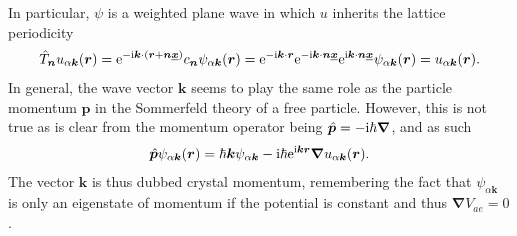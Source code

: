 In particular, $\psi$ is a weighted plane wave in which $u$ inherits the lattice periodicity
\begin{align}
    \hat T_{\bm n} u_{\alpha{\bm k}}({\bm r})
    =
    \mathrm e^{-\mathrm i{\bm k}\cdot \left( {\bm r}+{\bm n}\underline{\bm x} \right)}c_{\bm n}\psi_{\alpha{\bm k}}({\bm r})
    =
    \mathrm e^{-\mathrm i{\bm k}\cdot {\bm r}}\mathrm e^{-\mathrm i{\bm k}\cdot {\bm n}\underline{\bm x}}\mathrm e^{\mathrm i{\bm k}\cdot {\bm n}\underline{\bm x}}\psi_{\alpha{\bm k}}({\bm r})
    =
    u_{\alpha{\bm k}}({\bm r}).
\end{align}
In general, the wave vector $\bm k$ seems to play the same role as the particle momentum $\bm p$ in the Sommerfeld theory of a free particle.
However, this is not true as is clear from the momentum operator being $\hat{\bm p}=-\mathrm i\hbar\bm \nabla$, and as such
\begin{align}
  \hat{\bm p}\psi_{\alpha{\bm k}}({\bm r}) = \hbar{\bm k}\psi_{\alpha{\bm k}} - \mathrm i\hbar\mathrm e^{\mathrm i{\bm k}{\bm r}}\bm\nabla u_{\alpha \bm k}(\bm r).
\end{align}
The vector ${\bm k}$ is thus dubbed crystal momentum, remembering the fact that $\psi_{\alpha{\bm k}}$ is only an eigenstate of momentum if the potential is constant and thus $\bm\nabla V_{ae}=0$.

